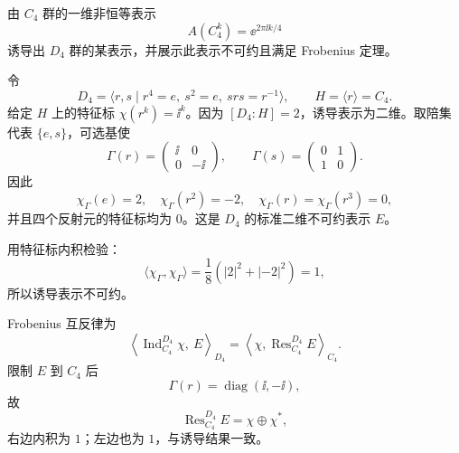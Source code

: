 \begin{question}[10 分]
由 $C_4$ 群的一维非恒等表示
\[
A(C_4^k)=\ee^{2\pi\ii k/4}
\]
诱导出 $D_4$ 群的某表示，并展示此表示不可约且满足 Frobenius 定理。
\begin{solution}
令
\[
D_4=\langle r,s\mid r^4=e,\ s^2=e,\ srs=r^{-1}\rangle,
\qquad H=\langle r\rangle=C_4.
\]
给定 $H$ 上的特征标 $\chi(r^k)=\ii^k$。因为 $[D_4:H]=2$，诱导表示为二维。取陪集代表 $\{e,s\}$，可选基使
\[
\Gamma(r)=\begin{pmatrix}\ii&0\\0&-\ii\end{pmatrix},
\qquad
\Gamma(s)=\begin{pmatrix}0&1\\1&0\end{pmatrix}.
\]
因此
\[
\chi_\Gamma(e)=2,\quad
\chi_\Gamma(r^2)=-2,\quad
\chi_\Gamma(r)=\chi_\Gamma(r^3)=0,
\]
并且四个反射元的特征标均为 $0$。这是 $D_4$ 的标准二维不可约表示 $E$。

用特征标内积检验：
\[
\langle\chi_\Gamma,\chi_\Gamma\rangle
=\frac18\left(|2|^2+|-2|^2\right)=1,
\]
所以诱导表示不可约。

Frobenius 互反律为
\[
\left\langle\operatorname{Ind}_{C_4}^{D_4}\chi,\ E\right\rangle_{D_4}
=\left\langle\chi,\operatorname{Res}_{C_4}^{D_4}E\right\rangle_{C_4}.
\]
限制 $E$ 到 $C_4$ 后
\[
\Gamma(r)=\operatorname{diag}(\ii,-\ii),
\]
故
\[
\operatorname{Res}_{C_4}^{D_4}E=\chi\oplus\chi^*,
\]
右边内积为 $1$；左边也为 $1$，与诱导结果一致。
\end{solution}
\end{question}

